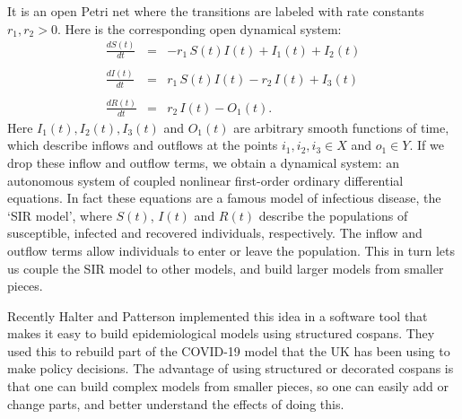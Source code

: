 \documentclass[reqno]{amsart}
\theoremstyle{definition}
\theoremstyle{remark}
\begin{document}
It is an open Petri net where the transitions are labeled with rate constants $r_1, r_2 > 0$.
Here is the corresponding open dynamical system:
\begin{equation}
\label{eq:openPetrir}
  \begin{array}{ccl} \displaystyle{\frac{dS(t)}{dt}} &=& -r_1 \, S(t)I(t)  + I_1(t) + I_2(t) \\ \\
\displaystyle{\frac{dI(t)}{dt}}  &=& r_1\, S(t)I(t) - r_2 \, I(t) + I_3(t)  \\  \\
\displaystyle{\frac{dR(t)}{dt}}  &=&   r_2 \, I(t)  - O_1(t).
\end{array}
\end{equation}
Here $I_1(t),I_2(t),I_3(t)$ and $O_1(t)$ are arbitrary smooth functions of time, which describe inflows and outflows at the points $i_1,i_2,i_3 \in X$ and $o_1 \in Y$.
If we drop these inflow and outflow terms, we obtain a dynamical system: an autonomous system of coupled nonlinear first-order ordinary differential equations.   In fact these equations are a famous model of infectious disease, the `SIR model', where $S(t)$, $I(t)$ and $R(t)$ describe the populations of susceptible, infected and recovered individuals, respectively.   The inflow and outflow terms allow individuals to enter or leave the population.   This in turn lets us couple the SIR model to other models, and build larger models from smaller pieces.  

Recently Halter and Patterson \cite{HP} implemented this idea in a software tool that makes it easy to build epidemiological models using structured cospans.  They used this to rebuild part of the COVID-19 model that the UK has been using to make policy decisions.  The advantage of using structured or decorated cospans is that one can build complex models from smaller pieces, so one can easily add or change parts, and better understand the effects of doing this.
\end{document}
